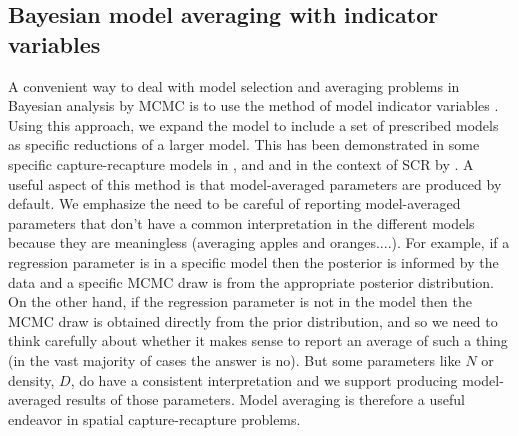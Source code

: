 \begin{comment}
As is pointed out in one of those posts, it's interesting to me that
both AIC and DIC are attempts at mimicking leave-one-out
cross-validation. Perhaps we could make the point that if DIC cannot
be trusted then one could always implement their own x-val
procedure... assuming it doesn't take months to complete.

Richard

On Thu, May 24, 2012 at 9:57 AM, Jeffrey Royle <jaroyle@gmail.com> wrote:
> hi all -- DIC is a hopeless black hole with, I think, no real possibility of
> making it seem reasonable to people.
> There is some good discussion on Gelman's blog, along with a number of
> papers (all cited there)
> http://andrewgelman.com/2006/07/number_of_param/
> http://andrewgelman.com/2011/06/plummer_on_dic/
> http://andrewgelman.com/2011/06/deviance_dic_ai/
>
> I gather that there are 3 version of DIC. The original one, and then
> Plummer's version which seems to be in JAGS and then the dumb version based
> on .5*var(deviance) which, I gather, you should never use -- I guess it
> sucks.
>
> I still can't compute Plummer's version using JAGS -- I think maybe I need
> to update my JAGS version or something.
\end{comment}





\subsection{Bayesian model averaging with indicator variables}

A convenient way to deal with model selection and averaging problems
in Bayesian analysis by MCMC is to use the method of model indicator
variables \citep{kuo_mallick:1998}. Using this approach, we expand the
model to include a set of prescribed models as specific reductions of
a larger model.  This has been demonstrated in some specific
capture-recapture models in \citet[][sec. 3.4.3]{royle_dorazio:2008},
and \citet{royle:2009} and in the context of SCR by
\citet{tobler_etal:2012}.  A useful aspect of this method is that
model-averaged parameters are produced by default. We emphasize the
need to be careful of reporting model-averaged parameters that don't
have a common interpretation in the different models because they are
meaningless (averaging apples and oranges....).  
For example, if a regression parameter is in a specific
model then the posterior is informed by the data and a specific MCMC
draw is from the appropriate posterior distribution. On the other
hand, if the regression parameter is not in the model then the MCMC
draw is obtained directly from the prior distribution, and so we need
to think carefully about whether it makes sense to report an average
of such a thing (in the vast majority of cases the answer is no). But
some parameters like $N$ or density, $D$, do have a consistent
interpretation and we support producing model-averaged results of
those parameters. Model averaging is therefore a useful endeavor in
spatial capture-recapture problems.

